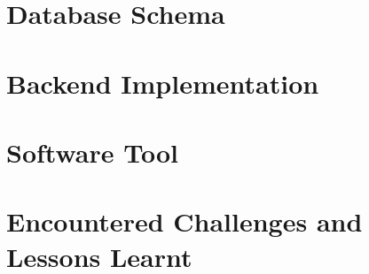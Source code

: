 \section{Database Schema}
\label{implementation:section:database}

\section{Backend Implementation}
\label{implementation:section:backend}

\section{Software Tool}
\label{implementation:section:tool}

\section{Encountered Challenges and Lessons Learnt}
\label{implementation:section:challenges}